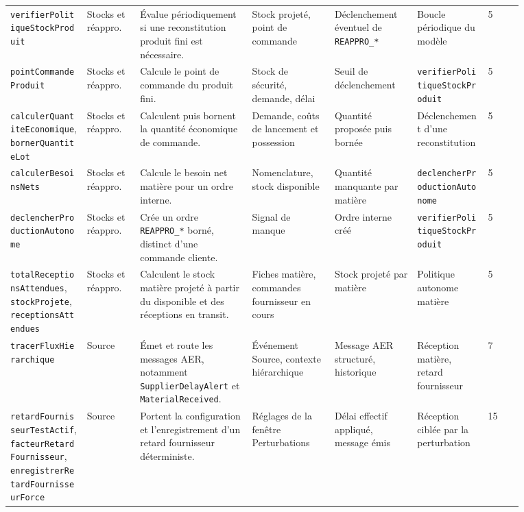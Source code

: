 \begin{landscape}
{\begin{longtable}{L{0.13\linewidth} L{0.09\linewidth} L{0.19\linewidth} L{0.14\linewidth} L{0.14\linewidth} L{0.12\linewidth} L{0.06\linewidth}}
\texttt{verifier\allowbreak Politique\allowbreak Stock\allowbreak Produit} & Stocks et réappro. & Évalue périodiquement si une reconstitution produit fini est nécessaire. & Stock projeté, point de commande & Déclenchement éventuel de \texttt{REAPPRO\_*} & Boucle périodique du modèle & 5 \\
\texttt{point\allowbreak Commande\allowbreak Produit} & Stocks et réappro. & Calcule le point de commande du produit fini. & Stock de sécurité, demande, délai & Seuil de déclenchement & \texttt{verifier\allowbreak Politique\allowbreak Stock\allowbreak Produit} & 5 \\
\texttt{calculer\allowbreak Quantite\allowbreak Economique}, \texttt{borner\allowbreak Quantite\allowbreak Lot} & Stocks et réappro. & Calculent puis bornent la quantité économique de commande. & Demande, coûts de lancement et possession & Quantité proposée puis bornée & Déclenchement d'une reconstitution & 5 \\
\texttt{calculer\allowbreak Besoins\allowbreak Nets} & Stocks et réappro. & Calcule le besoin net matière pour un ordre interne. & Nomenclature, stock disponible & Quantité manquante par matière & \texttt{declencher\allowbreak Production\allowbreak Autonome} & 5 \\
\texttt{declencher\allowbreak Production\allowbreak Autonome} & Stocks et réappro. & Crée un ordre \texttt{REAPPRO\_*} borné, distinct d'une commande cliente. & Signal de manque & Ordre interne créé & \texttt{verifier\allowbreak Politique\allowbreak Stock\allowbreak Produit} & 5 \\
\texttt{total\allowbreak Receptions\allowbreak Attendues}, \texttt{stock\allowbreak Projete}, \texttt{receptions\allowbreak Attendues} & Stocks et réappro. & Calculent le stock matière projeté à partir du disponible et des réceptions en transit. & Fiches matière, commandes fournisseur en cours & Stock projeté par matière & Politique autonome matière & 5 \\

\texttt{tracer\allowbreak Flux\allowbreak Hierarchique} & Source & Émet et route les messages AER, notamment \texttt{Supplier\allowbreak Delay\allowbreak Alert} et \texttt{Material\allowbreak Received}. & Événement Source, contexte hiérarchique & Message AER structuré, historique & Réception matière, retard fournisseur & 7 \\
\texttt{retard\allowbreak Fournisseur\allowbreak Test\allowbreak Actif}, \texttt{facteur\allowbreak Retard\allowbreak Fournisseur}, \texttt{enregistrer\allowbreak Retard\allowbreak Fournisseur\allowbreak Force} & Source & Portent la configuration et l'enregistrement d'un retard fournisseur déterministe. & Réglages de la fenêtre Perturbations & Délai effectif appliqué, message émis & Réception ciblée par la perturbation & 15 \\


\end{longtable}}
\end{landscape}
